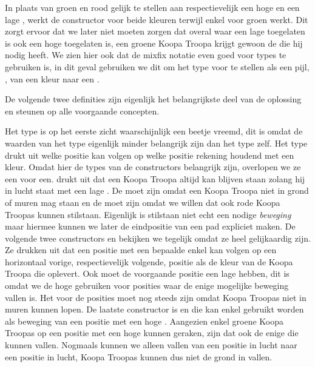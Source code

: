 
In plaats van groen en rood gelijk te stellen aan respectievelijk een hoge en
een lage , werkt de constructor  voor beide
kleuren terwijl  enkel voor groen werkt. Dit zorgt ervoor dat we
later niet moeten zorgen dat overal waar een lage  toegelaten
is ook een hoge  toegelaten is, een groene Koopa Troopa krijgt
gewoon de  die hij nodig heeft. We zien hier ook dat de mixfix
notatie even goed voor types te gebruiken is, in dit geval gebruiken we dit om
het type voor te stellen als een pijl, , van een kleur naar een
.

De volgende twee definities zijn eigenlijk het belangrijkste deel van de
oplossing en steunen op alle voorgaande concepten.


Het  type is op het eerste zicht waarschijnlijk een beetje
vreemd, dit is omdat de waarden van het type eigenlijk minder belangrijk zijn
dan het type zelf. Het type drukt uit welke positie kan volgen op welke positie
rekening houdend met een kleur. Omdat hier de types van de constructors
belangrijk zijn, overlopen we ze een voor een.  drukt uit dat een
Koopa Troopa altijd kan blijven staan zolang hij in lucht staat met een lage
. De  moet  zijn omdat een Koopa
Troopa niet in grond of muren mag staan en de  moet
 zijn omdat we willen dat ook rode Koopa Troopas kunnen stilstaan.
Eigenlijk is stilstaan niet echt een nodige \emph{beweging} maar hiermee kunnen
we later de eindpositie van een pad expliciet maken. De volgende twee
constructors  en  bekijken we tegelijk omdat ze heel
gelijkaardig zijn. Ze drukken uit dat een positie met een bepaalde
 enkel kan volgen op een horizontaal vorige, respectievelijk
volgende, positie als de kleur van de Koopa Troopa die 
oplevert. Ook moet de voorgaande positie een lage  hebben, dit
is omdat we de hoge  gebruiken voor posities waar de enige
mogelijke beweging vallen is. Het  voor de posities moet nog
steeds  zijn omdat Koopa Troopas niet in muren kunnen lopen.  De
laatste constructor is  en die kan enkel gebruikt worden als
beweging van een positie met een hoge . Aangezien enkel groene
Koopa Troopas op een positie met een hoge  kunnen geraken,
zijn dat ook de enige die kunnen vallen. Nogmaals kunnen we alleen vallen van
een positie in lucht naar een positie in lucht, Koopa Troopas kunnen dus niet
de grond in vallen.

